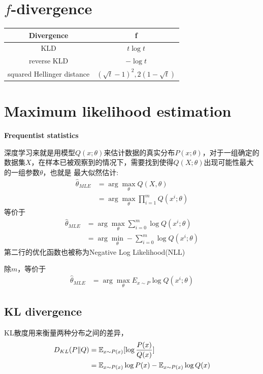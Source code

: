 \section{$f$-divergence}
\begin{tabular}{cc}
\toprule
Divergence & f \\
\midrule
KLD & $t\log{t}$ \\
reverse KLD & $-\log{t}$ \\
squared Hellinger distance & $(\sqrt{t} - 1)^2, 2(1 - \sqrt{t})$ \\
\bottomrule
\end{tabular}

\section{Maximum likelihood estimation}
\textbf{Frequentist statistics}

深度学习来就是用模型$Q(x;\theta)$来估计数据的真实分布$P(x;\theta)$，对于一组确定的数据集$X$，在样本已被观察到的情况下，需要找到使得$Q(X; \theta)$出现可能性最大的一组参数$\theta$，也就是
最大似然估计:
\begin{equation}
    \begin{split}
        \hat{\theta}_{MLE} &= \arg \max_\theta Q(X, \theta) \\
        &= \arg \max_{\theta} \prod _{i=1}^m Q(x^i; \theta)
    \end{split}
\end{equation}
等价于
\begin{equation}
    \begin{split}
        \hat{\theta}_{MLE} &= \arg \max_{\theta} \sum_{i=0}^m \log Q(x^i; \theta) \\
        &= \arg \min_{\theta} - \sum_{i=0}^m \log Q(x^i; \theta)
    \end{split}
\end{equation}
第二行的优化函数也被称为Negative Log Likelihood(NLL)


除$m$，等价于
\begin{equation}
    \begin{split}
        \hat{\theta}_{MLE} &= \arg \max_{\theta} E _{x \sim P} \log Q(x^i; \theta)
    \end{split}
\end{equation}

\subsection{KL divergence}
KL散度用来衡量两种分布之间的差异，
\begin{equation}
    \begin{split}
        D_{KL}(P\|Q)
        &= \mathbb{E}_{x \sim P(x)}[\log \frac{P(x)}{Q(x)}] \\
        &= \mathbb{E}_{x \sim P(x)} \log P(x) - \mathbb{E}_{x \sim P(x)} \log Q(x)
    \end{split}
\end{equation}


